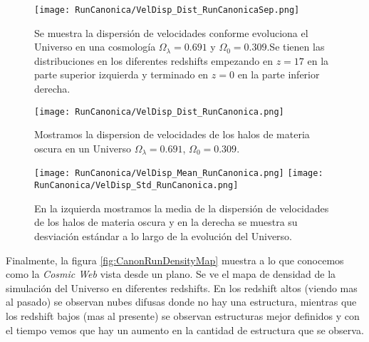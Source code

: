 \begin{figure}[H]
    \centering
    \texttt{[image: RunCanonica/VelDisp\_Dist\_RunCanonicaSep.png]}
    \caption[Dispersión de velocidades]{\footnotesize Se muestra la dispersión de velocidades conforme evoluciona el Universo en una cosmología $\Omega_\lambda = 0.691 $ y $\Omega_0 = 0.309$.Se tienen las distribuciones en los diferentes redshifts empezando en $z=17$ en la parte superior izquierda y terminado en $z=0$ en la parte inferior derecha.}
    \label{fig:Canon-VelDispDistSep}
\end{figure}

\begin{figure}[H]
    \centering
    \texttt{[image: RunCanonica/VelDisp\_Dist\_RunCanonica.png]}
    \caption[Distribución de la dispersión de velocidades]{\footnotesize Mostramos la dispersion de velocidades de los halos de materia oscura en un Universo $\Omega_\lambda = 0.691 $, $\Omega_0 = 0.309$.}
    \label{fig:Canon-VelDispDist}
\end{figure}

\begin{figure}[H]
    \centering
    \texttt{[image: RunCanonica/VelDisp\_Mean\_RunCanonica.png]}
    \texttt{[image: RunCanonica/VelDisp\_Std\_RunCanonica.png]}
    \caption[Media y desviación estándar de la dispersión de velocidades]{\footnotesize En la izquierda mostramos la media de la dispersión de velocidades de los halos de materia oscura y en la derecha se muestra su desviación estándar a lo largo de la evolución del Universo.}
    \label{fig:Canon-VelDispStats}
\end{figure}

Finalmente, la figura \ref{fig:CanonRunDensityMap} muestra a lo que conocemos como la \emph{Cosmic Web} vista desde un plano. Se ve el mapa de densidad de la simulación del Universo en diferentes redshifts. En los redshift altos (viendo mas al pasado) se observan nubes difusas donde no hay una estructura, mientras que los redshift bajos (mas al presente) se observan estructuras mejor definidos y con el tiempo vemos que hay un aumento en la cantidad de estructura que se observa.

